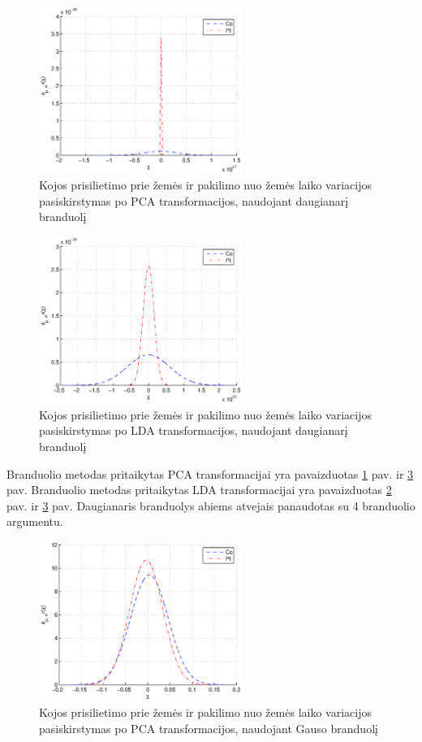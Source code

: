 \documentclass[]{vgtuef}
\begin{document}
\begin{figure}[!t]
  \centering
  \includegraphics[width=250px]{figures/st_sw_poly_kpca.eps}
  \caption{Kojos prisilietimo prie žemės ir pakilimo nuo žemės laiko variacijos pasiskirstymas po PCA transformacijos, naudojant daugianarį branduolį}
  \label{fig:poly_pca}
\end{figure}

\begin{figure}[!t]
  \centering
  \includegraphics[width=250px]{figures/st_sw_poly_gda.eps}
  \caption{Kojos prisilietimo prie žemės ir pakilimo nuo žemės laiko variacijos pasiskirstymas po LDA transformacijos, naudojant daugianarį branduolį}
  \label{fig:poly_lda}
\end{figure}

Branduolio metodas pritaikytas PCA transformacijai yra pavaizduotas \ref{fig:poly_pca} pav. ir \ref{fig:gauss_pca} pav. Branduolio metodas pritaikytas LDA transformacijai yra pavaizduotas \ref{fig:poly_lda} pav. ir \ref{fig:gauss_pca} pav. Daugianaris branduolys abiems atvejais panaudotas su 4 branduolio argumentu.

\begin{figure}[!t]
  \centering
  \includegraphics[width=250px]{figures/st_sw_gauss_kpca.eps}
  \caption{Kojos prisilietimo prie žemės ir pakilimo nuo žemės laiko variacijos pasiskirstymas po PCA transformacijos, naudojant Gauso branduolį}
  \label{fig:gauss_pca}
\end{figure}
\end{document}

